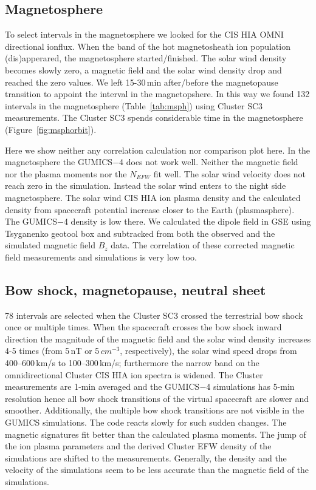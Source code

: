 \documentclass[linenumbers,draft]{agujournal}
\begin{document}
\subsection{Magnetosphere}
\label{sec:msph}

To select intervals in the magnetosphere we looked for the CIS HIA OMNI directional ionflux. When the band of the hot magnetosheath ion population (dis)apperared, the magnetosphere started/finished. The solar wind density becomes slowly zero, a magnetic field and the solar wind density drop and reached the zero values. We left 15-30\,min after/before the magnetopause transition to appoint the interval in the magnetopshere. In this way we found 132 intervals in the magnetosphere (Table~\ref{tab:msph}) using Cluster SC3 measurements. The Cluster SC3 spends considerable time in the magnetosphere (Figure~\ref{fig:msphorbit}). 

Here we show neither any correlation calculation nor comparison plot here. In the magnetosphere the GUMICS$-$4 does not work well. Neither the magnetic field nor the plasma moments nor the $N_{EFW}$ fit well. The solar wind velocity does not reach zero in the simulation. Instead the solar wind enters to the night side magnetosphere. The solar wind CIS HIA ion plasma density and the calculated density from spacecraft potential increase closer to the Earth (plasmasphere). The GUMICS$-$4 density is low there. We calculated the dipole field in GSE using Tsyganenko geotool box \citep{tsyganenko95:_model_earth} and subtracked from both the observed and the simulated magnetic field $B_z$ data. The correlation of these corrected magnetic field measurements and simulations is very low too. 

\subsection{Bow shock, magnetopause, neutral sheet}
\label{sec:bs}

78 intervals are selected when the Cluster SC3 crossed the terrestrial bow shock once or multiple times. When the spacecraft crosses the bow shock inward direction the magnitude of the magnetic field and the solar wind density increases 4-5 times (from 5\,nT or 5\,$cm^{-3}$, respectively), the solar wind speed drops from 400--600\,km/s to 100--300\,km/s; furthermore the narrow band on the omnidirectional Cluster CIS HIA ion spectra is widened. The Cluster measurements are 1-min averaged and the GUMICS$-$4 simulations has 5-min resolution hence all bow shock transitions of the virtual spacecraft are slower and smoother. Additionally, the multiple bow shock transitions are not visible in the GUMICS simulations. The code reacts slowly for such sudden changes. The magnetic signatures fit better than the calculated plasma moments. The jump of the ion plasma parameters and the derived Cluster EFW density of the simulations are shifted to the measurements. Generally, the density and the velocity of the simulations seem to be less accurate than the magnetic field of the simulations.
\end{document}
